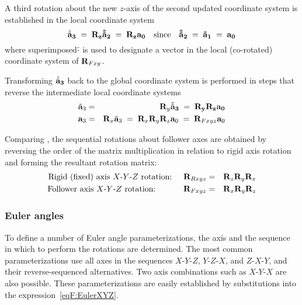 A third rotation about the new $z$-axis of the second updated coordinate system
is established in the local coordinate system
%
\begin{equation}
\tilde{\tilde{\bf a}}_3 \;=\; {\bf R}_z\tilde{\tilde{\bf a}}_2 \;=\;
{\bf R}_z{\bf a}_0
\quad\text{since}\quad
\tilde{\tilde{\bf a}}_2 \;=\; \tilde{\bf a}_1 \;=\; {\bf a}_0
\end{equation}
%
where superimposed $\tilde{\tilde{}}$ is used to designate a vector in the
local (co-rotated) coordinate system of ${\bf R}_{Fxy}$.

Transforming $\tilde{\tilde{\bf a}}_3$ back to the global coordinate system is
performed in steps that reverse the intermediate local coordinate systems
%
\begin{eqnarray}
\tilde{\bf a}_3 &=& {\bf R}_y\tilde{\tilde{\bf a}}_3 \;=\;
{\bf R}_y{\bf R}_z{\bf a}_0 \\
{\bf a}_3 &=& {\bf R}_x\tilde{\bf a}_3 \;=\;
{\bf R}_x{\bf R}_y{\bf R}_z{\bf a}_0 \;=\; {\bf R}_{Fxyz}{\bf a}_0
\label{eqF:FollowerXYZ}
\end{eqnarray}

Comparing ,
the sequential rotations about follower axes are obtained by reversing the
order of the matrix multiplication in relation to rigid axis rotation and
forming the resultant rotation matrix:
%
\begin{eqnarray}
\text{Rigid (fixed) axis $X$-$Y$-$Z$ rotation:} \hskip5mm {\mf R}_{Rxyz} &=&
{\mf R}_z{\mf R}_y{\mf R}_x \\
\text{Follower axis $X$-$Y$-$Z$ rotation:} \hskip12mm {\mf R}_{Fxyz} &=&
{\mf R}_x{\mf R}_y{\mf R}_z
\label{eqF:EulerXYZ}
\end{eqnarray}

\subsubsection{Euler angles}

To define a number of Euler angle parameterizations,
the axis and the sequence in which to perform the rotations are determined.
The most common parameterizations use all axes in the sequences $X$-$Y$-$Z$,
$Y$-$Z$-$X$, and $Z$-$X$-$Y$, and their reverse-sequenced alternatives.
Two axis combinations such as $X$-$Y$-$X$ are also possible.
These parameterizations are easily established by substitutions into the
expression~\eqref{eqF:EulerXYZ}.

